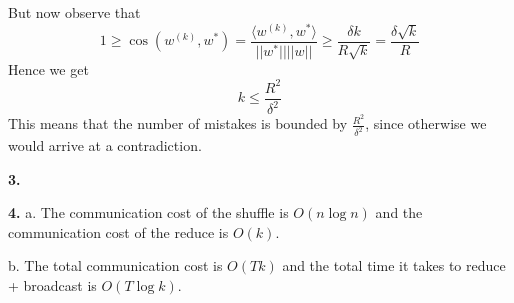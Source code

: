 \documentclass[11pt]{article}
\begin{document}
But now observe that
\[
1 \geq \cos(w^{(k)}, w^*) = \frac{\langle w^{(k)}, w^* \rangle}{||w^*|| ||w||} \geq \frac{\delta k}{R\sqrt{k}} = \frac{\delta \sqrt{k}}{R}
\]
Hence we get
\[
k \leq \frac{R^2}{\delta^2}
\]
This means that the number of mistakes is bounded by $\frac{R^2}{\delta^2}$, since otherwise we would arrive at a contradiction.


\noindent\textbf{3.}


\noindent\textbf{4.}
a. The communication cost of the shuffle is $O(n\log n)$ and the communication cost of the reduce is $O(k)$.

b. The total communication cost is $O(Tk)$ and the total time it takes to reduce + broadcast is $O(T\log k)$.
\end{document}
